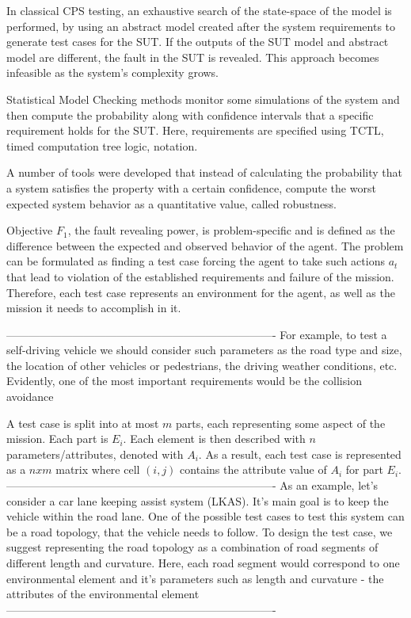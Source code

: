 In classical CPS testing, an exhaustive search of the state-space of the model is performed, by using an abstract model created after the system requirements to generate test cases for the SUT. If the outputs of the SUT model and abstract model are different, the fault in the SUT is revealed.
This approach becomes infeasible as the system's complexity grows.

Statistical Model Checking methods monitor some simulations of the system and then compute the probability along with confidence intervals that a specific requirement holds for the SUT. Here, requirements are specified using TCTL, timed computation tree logic, notation.

A number of tools were developed that instead of calculating the probability that a system satisfies the property with a certain confidence, compute the worst expected system behavior as a quantitative value, called robustness.


Objective $ F_1 $, the fault revealing power, is problem-specific and is defined as the difference between the expected and observed behavior of the agent.
The problem can be formulated as finding a test case forcing the agent to take such actions $ a_t $ that lead to violation of the established requirements and failure of the mission.
Therefore, each test case represents an environment for the agent, as well as the mission it needs to accomplish in it.


-------------------------------------------------------------------------\newline
For example, to test a self-driving vehicle we should
consider such parameters as the road type and size, the
location of other vehicles or pedestrians, the driving weather
conditions, etc. Evidently, one of the most important requirements would be the collision avoidance


A test case is split into at most $ m $ parts, each representing some aspect of the mission. Each part is $ E_i $.
Each element is then described with $ n $ parameters/attributes, denoted with $ A_i $.
As a result, each test case is represented as a $ nxm $ matrix where cell $ (i, j) $ contains the attribute value of $ A_i $ for part $ E_i $.
-------------------------------------------------------------------------\newline
As an example, let’s consider a car lane keeping assist
system (LKAS). It’s main goal is to keep the vehicle within
the road lane. One of the possible test cases to test this system
can be a road topology, that the vehicle needs to follow. To
design the test case, we suggest representing the road topology as a combination of road segments of different length
and curvature. Here, each road segment would correspond
to one environmental element and it’s parameters such as
length and curvature - the attributes of the environmental
element
-------------------------------------------------------------------------\newline

